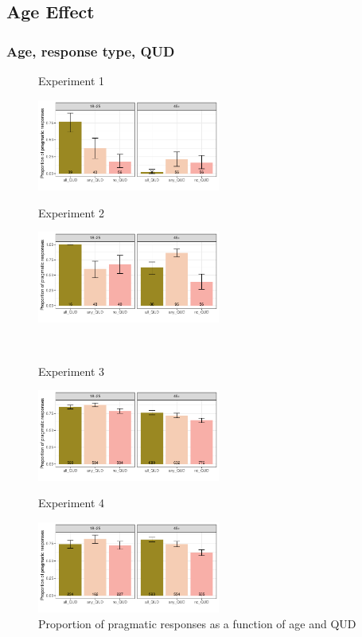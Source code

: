 \documentclass[12pt]{article}
\begin{document}
\pagebreak
\subsection*{Age Effect}
\subsubsection*{Age, response type, QUD}
\begin{figure}[!h] 
    \centering
    \begin{minipage}{.5\textwidth}
        \caption*{Experiment 1}
        \includegraphics[height=3cm]{img/exp1_age_pragmatic.pdf}
    \end{minipage}%
    \begin{minipage}{.5\textwidth}
        \caption*{Experiment 2}
        \includegraphics[height=3cm]{img/exp2_age_pragmatic.pdf}
    \end{minipage}%
    \\
    \begin{minipage}{.5\textwidth}
        \caption*{Experiment 3}
        \includegraphics[height=3cm]{img/exp3_age_pragmatic.pdf}
    \end{minipage}%
    \begin{minipage}{.5\textwidth}
        \caption*{Experiment 4}
        \includegraphics[height=3cm]{img/exp4_age_pragmatic.pdf}
    \end{minipage}%
    \caption{Proportion of pragmatic responses as a function of age and QUD}
\end{figure}
\end{document}
